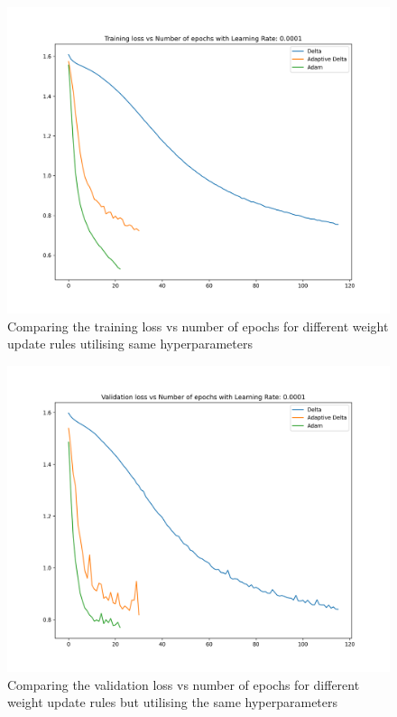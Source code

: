 \documentclass[10pt,a4paper]{article}
\begin{document}
\begin{figure}%
    \centering
    \includegraphics[scale=0.6]{training_loss_0.0001.png}%
    \caption{Comparing the training loss vs number of epochs for different weight update rules utilising same hyperparameters}%
    \label{fig:8}%
\end{figure}

\begin{figure}%
    \centering
    \includegraphics[scale=0.6]{validation_loss_0.0001.png}%
    \caption{Comparing the validation loss vs number of epochs for different weight update rules but utilising the same hyperparameters}%
    \label{fig:9}%
\end{figure}
\end{document}
